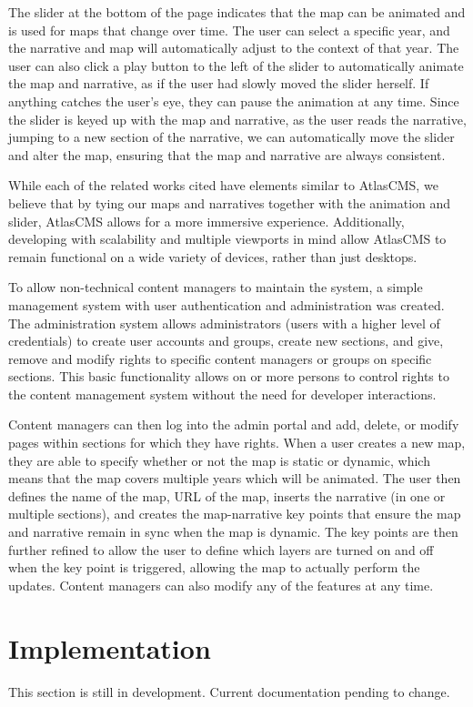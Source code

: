 \documentclass[11pt, draftcls, conference, onecolumn]{IEEEtran}
\begin{document}
The slider at the bottom of the page indicates that the map can be animated and is used for maps that change over time. The user can select a specific year, and the narrative and map will automatically adjust to the context of that year. The user can also click a play button to the left of the slider to automatically animate the map and narrative, as if the user had slowly moved the slider herself. If anything catches the user's eye, they can pause the animation at any time. Since the slider is keyed up with the map and narrative, as the user reads the narrative, jumping to a new section of the narrative, we can automatically move the slider and alter the map, ensuring that the map and narrative are always consistent.

While each of the related works cited have elements similar to AtlasCMS, we believe that by tying our maps and narratives together with the animation and slider, AtlasCMS allows for a more immersive experience. Additionally, developing with scalability and multiple viewports in mind allow AtlasCMS to remain functional on a wide variety of devices, rather than just desktops.

To allow non-technical content managers to maintain the system, a simple management system with user authentication and administration was created. The administration system allows administrators (users with a higher level of credentials) to create user accounts and groups, create new sections, and give, remove and modify rights to specific content managers or groups on specific sections. This basic functionality allows on or more persons to control rights to the content management system without the need for developer interactions.

Content managers can then log into the admin portal and add, delete, or modify pages within sections for which they have rights. When a user creates a new map, they are able to specify whether or not the map is static or dynamic, which means that the map covers multiple years which will be animated. The user then defines the name of the map, URL of the map, inserts the narrative (in one or multiple sections), and creates the map-narrative key points that ensure the map and narrative remain in sync when the map is dynamic. The key points are then further refined to allow the user to define which layers are turned on and off when the key point is triggered, allowing the map to actually perform the updates. Content managers can also modify any of the features at any time.

\section{Implementation}
This section is still in development. Current documentation pending to change.
\end{document}
